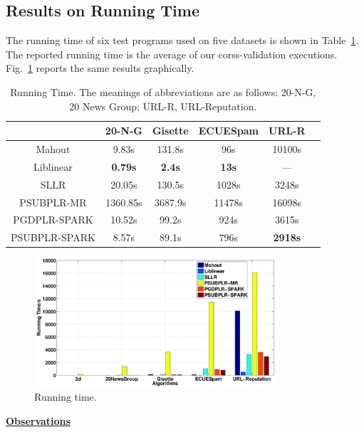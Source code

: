 \documentclass[10pt, conference, compsocconf]{IEEEtran}
\begin{document}
\subsection{Results on Running Time} \label{sec:time}

The running time of six test programs used on five datasets is shown in Table~\ref{tab:table4}.
The reported running time is the average of our corss-validation executions. Fig.~\ref{fig:08} reports the same results graphically.
%
\begin{table}[h]
\centering
\caption{Running Time. The meanings of abbreviations are as follows: 20-N-G, 20 News Group; URL-R, URL-Reputation.}\label{tab:table4}\vspace{-0.3cm}
\begin{tabular}{|c|c|c|c|c|c|}
\hline
           & 20-N-G & Gisette & ECUESpam & URL-R \\
\hline
Mahout     & 9.83s & 131.8s & 96s & 10100s \\
\hline
Liblinear  & \textbf{0.79s} & \textbf{2.4s} & \textbf{13s} & --- \\
\hline
SLLR       & 20.05s & 130.5s & 1028s & 3248s \\
\hline
PSUBPLR-MR & 1360.85s & 3687.9s & 11478s & 16098s \\
\hline
PGDPLR-SPARK & 10.52s & 99.2s & 924s & 3615s \\
\hline
PSUBPLR-SPARK & 8.57s & 89.1s & 796s & \textbf{2918s} \\
\hline
\end{tabular}
\end{table}


\begin{figure}[tb]
\center \includegraphics[height=4.8cm,width=9cm]{img/all_time.eps}
\vspace{-0.3cm}
\caption{Running time.}\label{fig:08}
\vspace{-0.2cm}
\end{figure}

\noindent
\underline{\bf Observations}
\end{document}
